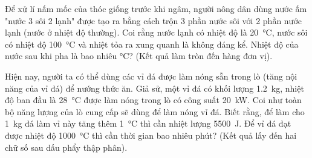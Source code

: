 \begin{ex}
	Để xử lí nấm mốc của thóc giống trước khi ngâm, người nông dân dùng nước ấm "nước 3 sôi 2 lạnh" được tạo ra bằng cách trộn 3 phần nước sôi với 2 phần nước lạnh (nước ở nhiệt độ thường). Coi rằng nước lạnh có nhiệt độ là \SI{20}{\celsius}, nước sôi có nhiệt độ \SI{100}{\celsius} và nhiệt tỏa ra xung quanh là không đáng kể. Nhiệt độ của nước sau khi pha là bao nhiêu \si{\celsius}? (Kết quả làm tròn đến hàng đơn vị).
	\loigiai{
		
	}
\end{ex}
\begin{ex}
	Hiện nay, người ta có thể dùng các vỉ đá được làm nóng sẵn trong lò (tăng nội năng của vỉ đá) để nướng thức ăn. Giả sử, một vỉ đá có khối lượng \SI{1.2}{\kilogram}, nhiệt độ ban đầu là \SI{28}{\celsius} được làm nóng trong lò có công suất \SI{20}{\kilo\watt}. Coi như toàn bộ năng lượng của lò cung cấp sẽ dùng để làm nóng vỉ đá. Biết rằng, để làm cho \SI{1}{\kilogram} đá làm vỉ này tăng thêm \SI{1}{\celsius} thì cần nhiệt lượng \SI{5500}{\joule}. Để vỉ đá đạt được nhiệt độ \SI{1000}{\celsius} thì cần thời gian bao nhiêu phút? (Kết quả lấy đến hai chữ số sau dấu phẩy thập phân).
	\loigiai{
		
	}
\end{ex}
\begin{ex}
	\loigiai{
		
	}
\end{ex}
